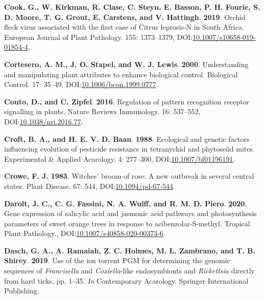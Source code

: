 \documentclass[12pt,final,CPage]{ufthesis}
\newlength{\cslhangindent}
\newenvironment{CSLReferences}[2] %
{%
	\setlength{\parindent}{0pt}
	\ifodd #1 \everypar{\setlength{\hangindent}{\cslhangindent}}\ignorespaces\fi
	\ifnum #2 > 0
	\setlength{\parskip}{#2\baselineskip}
	\fi
}%
{}
\begin{document}
{\begin{CSLReferences}{1}{0}
  \leavevmode{}%
  \textbf{Cook, G., W. Kirkman, R. Clase, C. Steyn, E. Basson, P. H. Fourie, S. D. Moore, T. G. Grout, E. Carstens, and V. Hattingh}. \textbf{2019}. {Orchid fleck virus} associated with the first case of {Citrus leprosis}-{N} in {South Africa}. European Journal of Plant Pathology. 155: 1373--1379, DOI:\href{https://doi.org/10.1007/s10658-019-01854-4}{10.1007/s10658-019-01854-4}.

  \leavevmode{}%
  \textbf{Cortesero, A. M., J. O. Stapel, and W. J. Lewis}. \textbf{2000}. Understanding and manipulating plant attributes to enhance biological control. Biological Control. 17: 35--49, DOI:\href{https://doi.org/10.1006/bcon.1999.0777}{10.1006/bcon.1999.0777}.

  \leavevmode{}%
  \textbf{Couto, D., and C. Zipfel}. \textbf{2016}. Regulation of pattern recognition receptor signalling in plants. Nature Reviews Immunology. 16: 537--552, DOI:\href{https://doi.org/10.1038/nri.2016.77}{10.1038/nri.2016.77}.

  \leavevmode{}%
  \textbf{Croft, B. A., and H. E. V. D. Baan}. \textbf{1988}. Ecological and genetic factors influencing evolution of pesticide resistance in tetranychid and phytoseiid mites. Experimental {\&} Applied Acarology. 4: 277--300, DOI:\href{https://doi.org/10.1007/bf01196191}{10.1007/bf01196191}.

  \leavevmode{}%
  \textbf{Crowe, F. J.} \textbf{1983}. Witches' broom of rose: A new outbreak in several central states. Plant Disease. 67: 544, DOI:\href{https://doi.org/10.1094/pd-67-544}{10.1094/pd-67-544}.

  \leavevmode{}%
  \textbf{Darolt, J. C., C. G. Fassini, N. A. Wulff, and R. M. D. Piero}. \textbf{2020}. Gene expression of salicylic acid and jasmonic acid pathways and photosynthesis parameters of sweet orange trees in response to acibenzolar-{S}-methyl. Tropical Plant Pathology., DOI:\href{https://doi.org/10.1007/s40858-020-00373-6}{10.1007/s40858-020-00373-6}.

  \leavevmode{}%
  \textbf{Dasch, G. A., A. Ramaiah, Z. C. Holmes, M. L. Zambrano, and T. B. Shirey}. \textbf{2019}. Use of the ion torrent {PGM} for determining the genomic sequences of {\emph{Francisella}} and {\emph{Coxiella}}-like endosymbionts and {\emph{Rickettsia}} directly from hard ticks, pp. 1--35. \emph{In} Contemporary Acarology. Springer International Publishing.


\end{CSLReferences}}
\end{document}

